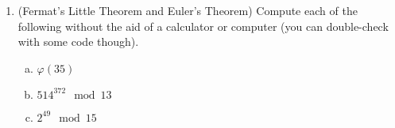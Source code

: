 \documentclass[12pt]{amsart}
\theoremstyle{plain}
\theoremstyle{definition}
\begin{document}
\begin{enumerate}[1.]
	\item (Fermat's Little Theorem and Euler's Theorem) Compute each of the following without the aid of a calculator or computer (you can double-check with some code though).
		\begin{enumerate}[a.]
			\item $\varphi(35)$
			\begin{framed}
			\vspace{.6in}
			\end{framed}
			\item $514^{372} \mod 13$
			\begin{framed}
			\vspace{1.3in}
			\end{framed}
			\item $2^{49} \mod 15$
			\begin{framed}
			\vspace{1.3in}
			\end{framed}
		\end{enumerate}


\end{enumerate}
\end{document}
